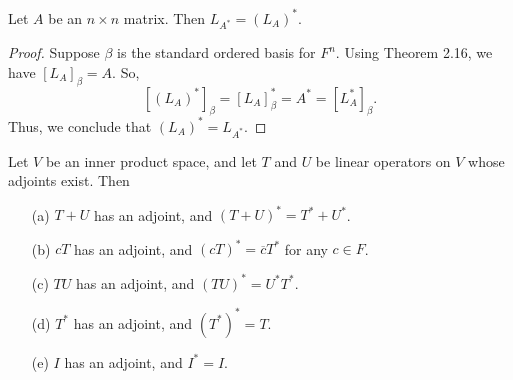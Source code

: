 \begin{corollary}
    Let \( A  \) be an \( n \times n  \) matrix. Then \( {L}_{A^{*}} = ({L}_{A})^{*} \).
\end{corollary}
\begin{proof}
    Suppose \( \beta \) is the standard ordered basis for \( F^{n} \). Using Theorem 2.16, we have \( [{L}_{A}]_{\beta} = A  \). So, 
    \[  [({L}_{A})^{*}]_{\beta} = [{L}_{A}]_{\beta}^{*} = A^{*} = [{L}_{A}^{*}]_{\beta}. \]
    Thus, we conclude that \( ({L}_{A})^{*} = {L}_{A^{*}} \).
\end{proof}
\begin{theorem}
   Let \( V  \) be an inner product space, and let \( T \) and \( U  \) be linear operators on \( V  \) whose adjoints exist. Then 
   \begin{enumerate}
       \item[(a)] \( T + U  \) has an adjoint, and \( (T+U)^{*} = T^{*} + U^{*} \).
       \item[(b)] \( cT  \) has an adjoint, and \( (cT)^{*} = \overline{c} T^{*} \) for any \( c \in F  \).
        \item[(c)] \( TU  \) has an adjoint, and \( (TU)^{*} = U^{*} T^{*} \).
        \item[(d)] \( T^{*} \) has an adjoint, and \( (T^{*})^{*} = T  \).
        \item[(e)] \( I  \) has an adjoint, and \( I^{*} = I  \).
   \end{enumerate}
\end{theorem}
